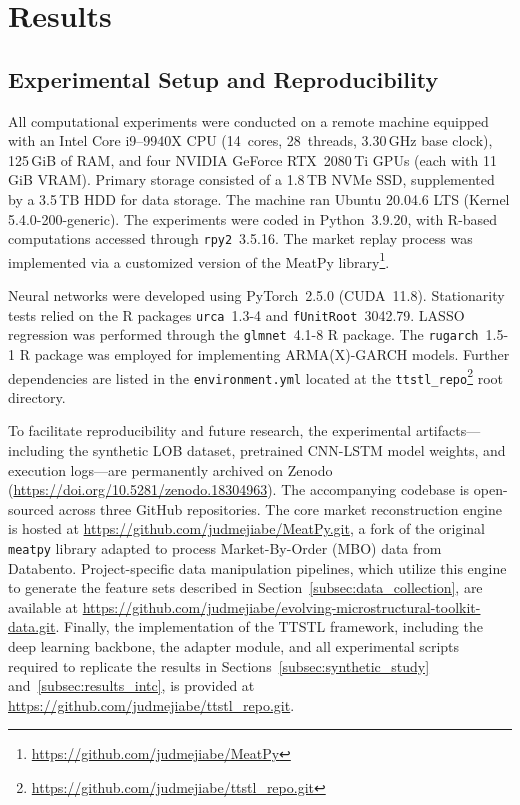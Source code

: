 \documentclass[10pt,a4paper,oneside]{article}
\begin{document}
\section{Results}
\label{sec:results}

\subsection{Experimental Setup and Reproducibility}
\label{subsec:exp_setup}

All computational experiments were conducted on a remote machine equipped with an Intel Core i9--9940X CPU (14~cores, 28~threads, 3.30\,GHz base clock), 125\,GiB of RAM, and four NVIDIA GeForce RTX~2080\,Ti GPUs (each with 11\,GiB VRAM). Primary storage consisted of a 1.8\,TB NVMe SSD, supplemented by a 3.5\,TB HDD for data storage. The machine ran Ubuntu 20.04.6 LTS (Kernel 5.4.0-200-generic). The experiments were coded in Python~3.9.20, with R-based computations accessed through \verb|rpy2|~3.5.16. The market replay process was implemented via a customized version of the MeatPy library\footnote{\url{https://github.com/judmejiabe/MeatPy}}.

Neural networks were developed using PyTorch~2.5.0 (CUDA~11.8). Stationarity tests relied on the R packages \verb|urca|~1.3-4 and \verb|fUnitRoot|~3042.79. LASSO regression was performed through the \verb|glmnet|~4.1-8 R package. The \verb|rugarch|~1.5-1 R package was employed for implementing ARMA(X)-GARCH models. Further dependencies are listed in the \verb|environment.yml| located at the \verb|ttstl_repo|\footnote{\url{https://github.com/judmejiabe/ttstl_repo.git}} root directory.

To facilitate reproducibility and future research, the experimental artifacts—including the synthetic LOB dataset, pretrained CNN-LSTM model weights, and execution logs—are permanently archived on Zenodo (\url{https://doi.org/10.5281/zenodo.18304963}). The accompanying codebase is open-sourced across three GitHub repositories. 
The core market reconstruction engine is hosted at \url{https://github.com/judmejiabe/MeatPy.git}, a fork of the original \verb|meatpy| library adapted to process Market-By-Order (MBO) data from Databento. Project-specific data manipulation pipelines, which utilize this engine to generate the feature sets described in Section~\ref{subsec:data_collection}, are available at \url{https://github.com/judmejiabe/evolving-microstructural-toolkit-data.git}.
Finally, the implementation of the TTSTL framework, including the deep learning backbone, the adapter module, and all experimental scripts required to replicate the results in Sections~\ref{subsec:synthetic_study} and~\ref{subsec:results_intc}, is provided at \url{https://github.com/judmejiabe/ttstl_repo.git}.
\end{document}
